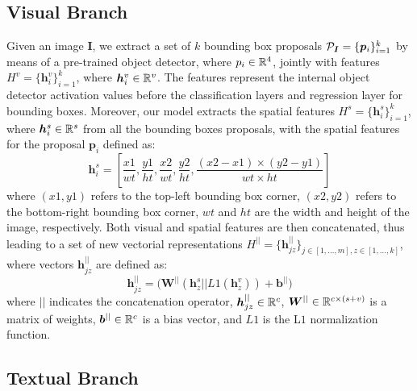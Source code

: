 \documentclass{article}
\begin{document}
\subsection{Visual Branch}

Given an image $\bm{I}$, we extract a set of $k$ bounding box
proposals $\mathcal{P}_{\bm{I}} = \{ \bm{p}_i \}^k_{i=1}$ by means of a
pre-trained object detector, where $p_i \in \mathbb{R}^4$, jointly with
features $H^v = \{ \bm{h}^v_i \}^k_{i=1}$, where $\bm{h}^v_i \in
\mathbb{R}^v$. The features represent the internal object detector
activation values before the classification layers and regression
layer for bounding boxes. Moreover, our model extracts the spatial
features $H^s = \{ \bm{h}^s_i \}^k_{i=1}$, where $\bm{h}^s_i \in
\mathbb{R}^s$ from all the bounding boxes proposals, with the spatial
features for the proposal $\bm{p}_i$ defined as:
\begin{equation}
  \bm{h}^s_i = \left[ \frac{x1}{wt}, \frac{y1}{ht}, \frac{x2}{wt}, \frac{y2}{ht}, \frac{(x2 - x1) \times (y2 - y1)}{wt \times ht}  \right]
\end{equation}
where $(x1, y1)$ refers to the top-left bounding box corner, $(x2,
y2)$ refers to the bottom-right bounding box corner, $wt$ and $ht$ are
the width and height of the image, respectively. Both visual and
spatial features are then concatenated, thus leading to a set of new
vectorial representations $H^{||} = \{ \bm{h}^{||}_{jz} \}_{j \in [1,
\ldots, m], z \in [1, \ldots, k]}$, where vectors $\bm{h}^{||}_{jz}$
are defined as:
\begin{equation}
  \bm{h}^{||}_{jz} = \Big( \bm{W}^{||} \left( \bm{h}^s_z || L1(\bm{h}^v_z) \right) + \bm{b}^{||} \Big) 
\end{equation}
where $||$ indicates the concatenation operator, $\bm{h}^{||}_{jz} \in
\mathbb{R}^c$, $\bm{W}^{||} \in \mathbb{R}^{c \times (s + v)}$ is a matrix
of weights, $\bm{b}^{||} \in \mathbb{R}^c$ is a bias vector, and $L1$ is
the L$1$ normalization function.


\subsection{Textual Branch}
\end{document}
